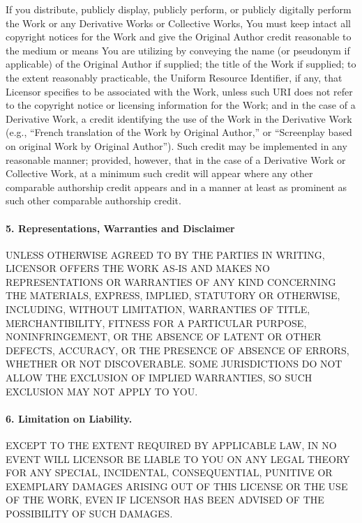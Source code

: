 If you distribute, publicly display, publicly perform, or publicly digitally perform the Work or any Derivative Works or Collective Works, You must keep intact all copyright notices for the Work and give the Original Author credit reasonable to the medium or means You are utilizing by conveying the name (or pseudonym if applicable) of the Original Author if supplied; the title of the Work if supplied; to the extent reasonably practicable, the Uniform Resource Identifier, if any, that Licensor specifies to be associated with the Work, unless such URI does not refer to the copyright notice or licensing information for the Work; and in the case of a Derivative Work, a credit identifying the use of the Work in the Derivative Work (e.g., ``French translation of the Work by Original Author,'' or ``Screenplay based on original Work by Original Author''). Such credit may be implemented in any reasonable manner; provided, however, that in the case of a Derivative Work or Collective Work, at a minimum such credit will appear where any other comparable authorship credit appears and in a manner at least as prominent as such other comparable authorship credit.

\paragraph{5. Representations, Warranties and Disclaimer}

UNLESS OTHERWISE AGREED TO BY THE PARTIES IN WRITING, LICENSOR OFFERS THE WORK AS-IS AND MAKES NO REPRESENTATIONS OR WARRANTIES OF ANY KIND CONCERNING THE MATERIALS, EXPRESS, IMPLIED, STATUTORY OR OTHERWISE, INCLUDING, WITHOUT LIMITATION, WARRANTIES OF TITLE, MERCHANTIBILITY, FITNESS FOR A PARTICULAR PURPOSE, NONINFRINGEMENT, OR THE ABSENCE OF LATENT OR OTHER DEFECTS, ACCURACY, OR THE PRESENCE OF ABSENCE OF ERRORS, WHETHER OR NOT DISCOVERABLE. SOME JURISDICTIONS DO NOT ALLOW THE EXCLUSION OF IMPLIED WARRANTIES, SO SUCH EXCLUSION MAY NOT APPLY TO YOU.

\paragraph{6. Limitation on Liability.}

EXCEPT TO THE EXTENT REQUIRED BY APPLICABLE LAW, IN NO EVENT WILL LICENSOR BE LIABLE TO YOU ON ANY LEGAL THEORY FOR ANY SPECIAL, INCIDENTAL, CONSEQUENTIAL, PUNITIVE OR EXEMPLARY DAMAGES ARISING OUT OF THIS LICENSE OR THE USE OF THE WORK, EVEN IF LICENSOR HAS BEEN ADVISED OF THE POSSIBILITY OF SUCH DAMAGES.

